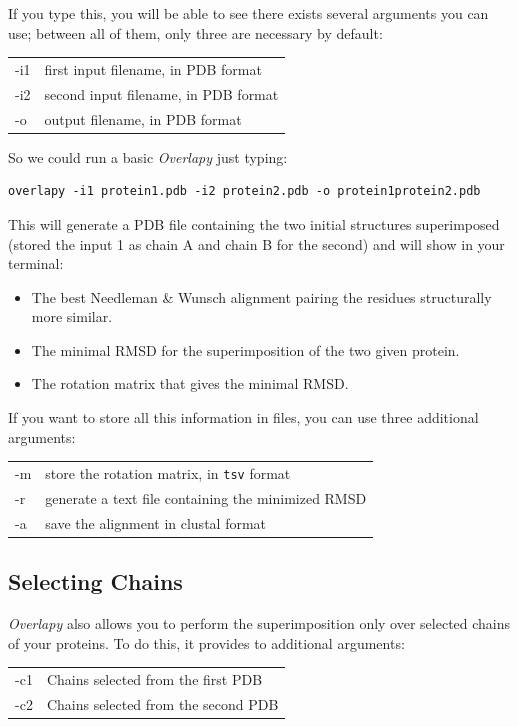 \documentclass{article}
\begin{document}
If you type this, you will be able to see there exists several arguments you can use; between all of them, only three are necessary by default:
\begin{center}
	\begin{tabular}{ |l|l| }
		\hline
		   	-i1 & first input filename, in PDB format\\
		    -i2 & second input filename, in PDB format\\
		    -o & output filename, in PDB format\\   
		\hline
	\end{tabular}
\end{center}

So we could run a basic \textit{Overlapy} just typing:
\lstset{language=bash}
\begin{lstlisting}
overlapy -i1 protein1.pdb -i2 protein2.pdb -o protein1protein2.pdb
\end{lstlisting}

This will generate a PDB file containing the two initial structures superimposed (stored the input 1 as chain A and chain B for the second) and will show in your terminal:
\begin{itemize}
	\item The best Needleman \& Wunsch alignment pairing the residues structurally more similar.
	\item The minimal RMSD for the superimposition of the two given protein.
	\item The rotation matrix that gives the minimal RMSD.
\end{itemize}

If you want to store all this information in files, you can use three additional arguments:
\begin{center}
	\begin{tabular}{ |l|l| }
		\hline
		   	-m & store the rotation matrix, in \texttt{tsv} format\\
		    -r & generate a text file containing the minimized RMSD\\
		    -a & save the alignment in clustal format\\   
		\hline
	\end{tabular}
\end{center}

\subsection*{\color{gray}Selecting Chains}
\textit{Overlapy} also allows you to perform the superimposition only over selected chains of your proteins. To do this, it provides to additional arguments:
\begin{center}
	\begin{tabular}{ |l|l| }
		\hline
		   	-c1 & Chains selected from the first PDB\\
		    -c2 & Chains selected from the second PDB\\
		\hline
	\end{tabular}
\end{center}
\end{document}
